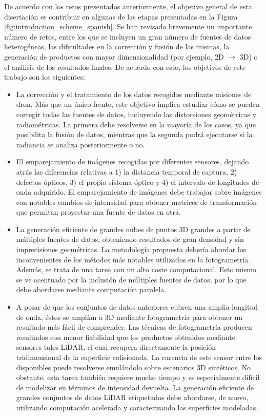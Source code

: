 De acuerdo con los retos presentados anteriormente, el objetivo general de esta disertación es contribuir en algunas de las etapas presentadas en la Figura \ref{fig:introduction_scheme_spanish}. Se han revisado brevemente un importante número de retos, entre los que se incluyen un gran número de fuentes de datos heterogéneas, las dificultades en la corrección y fusión de las mismas, la generación de productos con mayor dimensionalidad (por ejemplo, 2D $\rightarrow$ 3D) o el análisis de los resultados finales. De acuerdo con esto, los objetivos de este trabajo son los siguientes:
\begin{itemize}
    \item La corrección y el tratamiento de los datos recogidos mediante misiones de dron. Más que un único frente, este objetivo implica estudiar cómo se pueden corregir todas las fuentes de datos, incluyendo las distorsiones geométricas y radiométricas. La primera debe resolverse en la mayoría de los casos, ya que posibilita la fusión de datos, mientras que la segunda podrá ejecutarse si la radiancia se analiza posteriormente o no.
    \item El emparejamiento de imágenes recogidas por diferentes sensores, dejando atrás las diferencias relativas a 1) la distancia temporal de captura, 2) defectos ópticos, 3) el propio sistema óptico y 4) el intervalo de longitudes de onda adquirido. El emparejamiento de imágenes debe trabajar sobre imágenes con notables cambios de intensidad para obtener matrices de transformación que permitan proyectar una fuente de datos en otra. 
    \item La generación eficiente de grandes nubes de puntos 3D grandes a partir de múltiples fuentes de datos, obteniendo resultados de gran densidad y sin imprecisiones geométricas. La metodología propuesta debería abordar los inconvenientes de los métodos más notables utilizados en la fotogrametría. Además, se trata de una tarea con un alto coste computacional. Esto mismo se ve acentuado por la inclusión de múltiples fuentes de datos, por lo que debe abordarse mediante computación paralela.
    \item A pesar de que los conjuntos de datos anteriores cubren una amplia longitud de onda, éstos se amplían a 3D mediante fotogrametría para obtener un resultado más fácil de comprender. Las técnicas de fotogrametría producen resultados con menor fiabilidad que los productos obtenidos mediante sensores tales LiDAR, el cual recupera directamente la posición tridimensional de la superficie colisionada. La carencia de este sensor entre los disponibles puede resolverse emulándolo sobre escenarios 3D sintéticos. No obstante, esta tarea también requiere mucho tiempo y es especialmente difícil de modelizar en términos de intensidad devuelta. La generación eficiente de grandes conjuntos de datos LiDAR etiquetados debe abordarse, de nuevo, utilizando computación acelerada y caracterizando las superficies modeladas.

\end{itemize}

